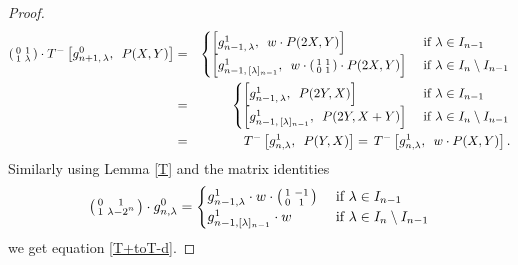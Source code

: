 \documentclass[11pt, reqno]{amsart}
\numberwithin{equation}{section}
\theoremstyle{definition}
\theoremstyle{remark}
\theoremstyle{definition}
\theoremstyle{remark}
\theoremstyle{remark}
\begin{document}
\begin{proof}
\begin{eqnarray*}
\left(\begin{smallmatrix}
       0&1\\
       1&\lambda
   \end{smallmatrix}\right)\cdot T^-\left[g_{n+1,\,\lambda}^{0}, \enspace P(X,Y)\right]
&=& \begin{cases}
       \left[g_{n-1,\,\lambda}^{1},\enspace w \cdot P(2X,Y)  \right] & \text{ if } \lambda \in I_{n-1} \\
        \left[g_{n-1,\,[\lambda]_{n-1}}^{1}, \enspace w \cdot \begin{psmallmatrix}
    1 & 1\\
    0 & 1
\end{psmallmatrix}\cdot P(2X,Y)  \right] & \text{ if } \lambda \in I_{n}\setminus I_{n-1}    
\end{cases}\\
&=& \begin{cases}
       \left[g_{n-1,\,\lambda}^{1},\enspace P(2Y,X)  \right] & \text{ if } \lambda \in I_{n-1} \\
        \left[g_{n-1,\,[\lambda]_{n-1}}^{1}, \enspace  P(2Y, X+Y)  \right] & \text{ if } \lambda \in I_{n}\setminus I_{n-1}       
\end{cases}\\
& = & T^-\left[g_{n,\lambda}^1, \enspace P(Y,X)\right] =\, T^-\left[g_{n,\lambda}^1, \enspace w \cdot P(X,Y)\right]. 
\end{eqnarray*}
Similarly using Lemma \ref{T} and the matrix identities
\begin{equation*}
\begin{psmallmatrix}
    0 & 1\\
    1 & \lambda-2^n
\end{psmallmatrix} \cdot g_{n,\lambda}^{0} = \begin{cases}
g_{n-1,\lambda}^{1}\cdot w \cdot\begin{psmallmatrix}
    1 & -1\\
    0 & 1
\end{psmallmatrix} & \text{ if }  \lambda \in I_{n-1}\\
 g_{n-1,[\lambda]_{n-1}}^{1}\cdot w & \text{ if } \lambda \in I_{n}\setminus I_{n-1}
\end{cases}
\end{equation*}
 we get equation \eqref{T+toT-d}.
\end{proof}
\end{document}
